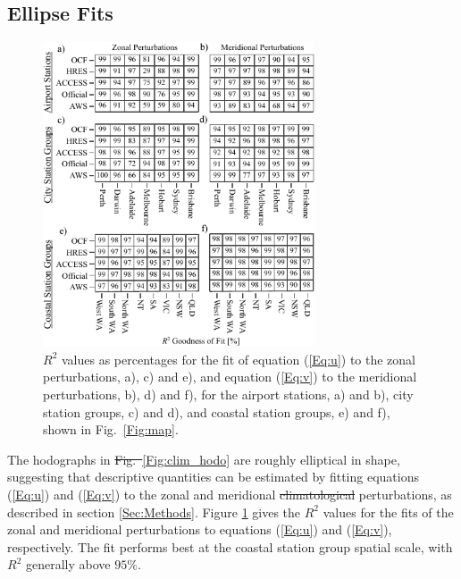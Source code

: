 \documentclass{ametsoc}
\providecommand{\DIFadd}[1]{{\protect\color{blue}\uwave{#1}}} %
\providecommand{\DIFdel}[1]{{\protect\color{red}\sout{#1}}}                      %
\providecommand{\DIFaddbegin}{} %
\providecommand{\DIFaddend}{} %
\providecommand{\DIFdelbegin}{} %
\providecommand{\DIFdelend}{} %
\providecommand{\DIFaddbeginFL}{} %
\providecommand{\DIFaddendFL}{} %
\providecommand{\DIFdelbeginFL}{} %
\providecommand{\DIFdelendFL}{} %
\begin{document}
\DIFaddend \subsection{Ellipse Fits}

\begin{figure}
\centering
\DIFdelbeginFL %
\DIFdelendFL \DIFaddbeginFL \includegraphics[width=19pc]{r_squared.pdf}
\DIFaddendFL \caption{$R^2$ values as percentages for the fit of equation (\ref{Eq:u}) to the zonal perturbations, a), c) and e), and equation (\ref{Eq:v}) to the meridional perturbations, b), d) and f), for the airport stations, a) and b), city station groups, c) and d), and coastal station groups, e) and f), shown in Fig.~\ref{Fig:map}.}
\label{Fig:r_squared}
\end{figure}

The hodographs in \DIFdelbegin \DIFdel{Fig.~}\DIFdelend \DIFaddbegin \DIFadd{Figs.~\ref{Fig:darwin_hodo} and }\DIFaddend \ref{Fig:clim_hodo} are roughly elliptical in shape, suggesting that descriptive quantities can be estimated by fitting equations (\ref{Eq:u}) and (\ref{Eq:v}) to the zonal and meridional \DIFdelbegin \DIFdel{climatological }\DIFdelend \DIFaddbegin \DIFadd{mean }\DIFaddend perturbations, as described in section \ref{Sec:Methods}. Figure \ref{Fig:r_squared} gives the $R^2$ values for the fits of the zonal and meridional perturbations to equations (\ref{Eq:u}) and (\ref{Eq:v}), respectively. The fit performs best at the coastal station group spatial scale, with $R^2$ generally above $95\%$. 
\end{document}
